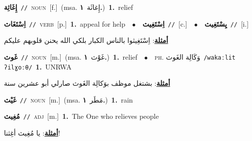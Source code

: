 \documentclass[10pt,a4paper,twoside]{article} %
\begin{document}
\begin{multicols}{2}
{\setlength\topsep{0pt}\textbf{\foreignlanguage{arabic}{إِغَاثِة}}\ {\color{gray}\texttt{//}\color{black}}\ \textsc{noun}\ [f.]\ \color{gray}(msa. \foreignlanguage{arabic}{إِغاثَة}~\foreignlanguage{arabic}{\textbf{١.}})\color{black}\ \textbf{1.}~relief\ } \vspace{2mm}

{\setlength\topsep{0pt}\textbf{\foreignlanguage{arabic}{اِسْتَغَاث}}\ {\color{gray}\texttt{//}\color{black}}\ \textsc{verb}\ [p.]\ \textbf{1.}~appeal for help\ \ $\bullet$\ \ \setlength\topsep{0pt}\textbf{\foreignlanguage{arabic}{اِسْتَغِيث}}\ {\color{gray}\texttt{//}\color{black}}\ [c.]\ \ $\bullet$\ \ \setlength\topsep{0pt}\textbf{\foreignlanguage{arabic}{يِسْتَغِيث}}\ {\color{gray}\texttt{//}\color{black}}\ [i.]\  \begin{flushright}\color{gray}\foreignlanguage{arabic}{\textbf{\underline{\foreignlanguage{arabic}{أمثلة}}}: اِسْتَغِيثوا بالناس الكبار بلكي الله يحنن قلوبهم عليكم}\end{flushright}\color{black}} \vspace{2mm}

{\setlength\topsep{0pt}\textbf{\foreignlanguage{arabic}{غَوث}}\ {\color{gray}\texttt{//}\color{black}}\ \textsc{noun}\ [m.]\ \color{gray}(msa. \foreignlanguage{arabic}{غَوْث}~\foreignlanguage{arabic}{\textbf{١.}})\color{black}\ \textbf{1.}~relief\ \ $\bullet$\ \ \textsc{ph.} \color{gray} \foreignlanguage{arabic}{وَكَالِة الغَوث}\color{black}\ {\color{gray}\texttt{/{\sffamily wakaːlit ʔilɣoːθ}/}\color{black}}\ \textbf{1.}~UNRWA\  \begin{flushright}\color{gray}\foreignlanguage{arabic}{\textbf{\underline{\foreignlanguage{arabic}{أمثلة}}}: بشتغل موظف بوَكالِة الغَوث صارلي أبو عشرين سنة}\end{flushright}\color{black}} \vspace{2mm}

{\setlength\topsep{0pt}\textbf{\foreignlanguage{arabic}{غَيْث}}\ {\color{gray}\texttt{//}\color{black}}\ \textsc{noun}\ [m.]\ \color{gray}(msa. \foreignlanguage{arabic}{مَطَر}~\foreignlanguage{arabic}{\textbf{١.}})\color{black}\ \textbf{1.}~rain\ } \vspace{2mm}

{\setlength\topsep{0pt}\textbf{\foreignlanguage{arabic}{مُغِيث}}\ {\color{gray}\texttt{//}\color{black}}\ \textsc{adj}\ [m.]\ \textbf{1.}~The One who relieves people\  \begin{flushright}\color{gray}\foreignlanguage{arabic}{\textbf{\underline{\foreignlanguage{arabic}{أمثلة}}}: يا مُغِيث أغِثنا!}\end{flushright}\color{black}} \vspace{2mm}


\end{multicols}
\end{document}

